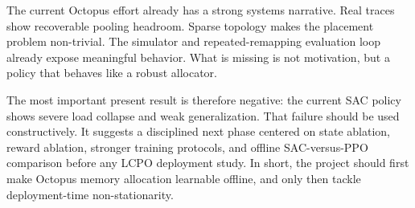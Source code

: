 \documentclass[11pt]{article}
\theoremstyle{definition}
\begin{document}
The current Octopus effort already has a strong systems narrative. Real traces
show recoverable pooling headroom. Sparse topology makes the placement problem
non-trivial. The simulator and repeated-remapping evaluation loop already expose
meaningful behavior. What is missing is not motivation, but a policy that behaves
like a robust allocator.

The most important present result is therefore negative: the current SAC policy
shows severe load collapse and weak generalization. That failure should be used
constructively. It suggests a disciplined next phase centered on state ablation,
reward ablation, stronger training protocols, and offline SAC-versus-PPO
comparison before any LCPO deployment study. In short, the project should first
make Octopus memory allocation learnable offline, and only then tackle
deployment-time non-stationarity.



\end{document}
